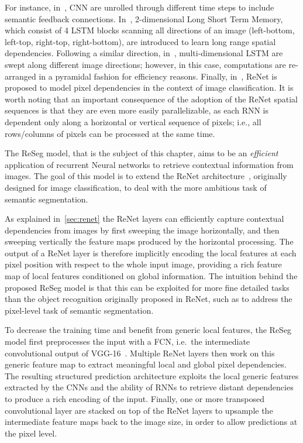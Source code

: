 For instance, in~\citep{Pinheiro:2014,Gatta14-deepvision}, CNN are
unrolled through different time steps to include semantic feedback connections.
In~\citep{byeon2015scene}, 2-dimensional Long Short Term Memory, which
consist of 4 LSTM blocks scanning all directions of an image (left-bottom,
left-top, right-top, right-bottom), are introduced to learn long range spatial
dependencies. Following a similar direction, in~\citep{stollenga2015parallel},
multi-dimensional LSTM are swept along different image directions; however, in
this case, computations are re-arranged in a pyramidal fashion for efficiency
reasons. Finally, in~\citep{visin2015renet}, ReNet is proposed to model pixel
dependencies in the context of image classification. It is worth noting that
an important consequence of the adoption of the ReNet spatial sequences is
that they are even more easily parallelizable, as each RNN is dependent only
along a horizontal or vertical sequence of pixels; i.e., all rows/columns of
pixels can be processed at the same time.

The ReSeg model, that is the subject of this chapter, aims to be an {\em
efficient} application of recurrent Neural networks to retrieve contextual
information from images. The goal of this model is to extend the ReNet
architecture~\citep{visin2015renet}, originally designed for image
classification, to deal with the more ambitious task of semantic segmentation.

As explained in~\autoref{sec:renet} the ReNet layers can efficiently
capture contextual dependencies from images by first sweeping the image
horizontally, and then sweeping vertically the feature maps produced by the
horizontal processing. The output of a ReNet layer is therefore implicitly
encoding the local features at each pixel position with respect to the whole
input image, providing a rich feature map of local features conditioned on
global information. The intuition behind the proposed ReSeg model is that this
can be exploited for more fine detailed tasks than the object recognition
originally proposed in ReNet, such as to address the pixel-level task of
semantic segmentation.

To decrease the training time and benefit from generic local features, the
ReSeg model first preprocesses the input with a FCN, i.e.\ the intermediate
convolutional output of VGG-16~\citep{Simonyan2015}. Multiple ReNet layers then
work on this generic feature map to extract meaningful local and global pixel
dependencies.
The resulting structured prediction architecture exploits the local generic
features extracted by the CNNs and the ability of RNNs to retrieve distant
dependencies to produce a rich encoding of the input. Finally, one or more
transposed convolutional layer are stacked on top of the ReNet layers to
upsample the intermediate feature maps back to the image size, in order to
allow predictions at the pixel level.

